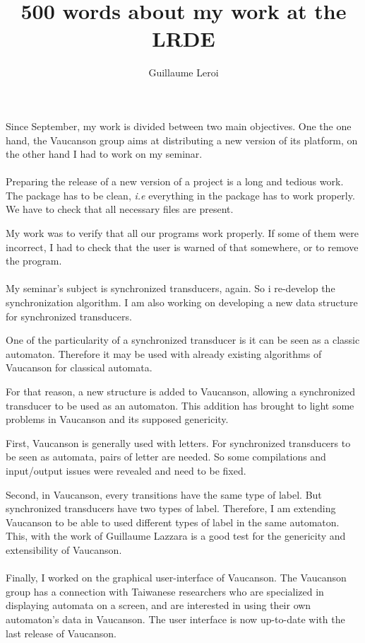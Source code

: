 \documentclass[a4paper, 11pt]{article}
\title{500 words about my work at the LRDE}
\author{Guillaume Leroi}
\begin{document}
\maketitle
\thispagestyle{empty}

Since September, my work is divided between two main objectives. One the one
hand, the Vaucanson group aims at distributing a new version of its platform, on
the other hand I had to work on my seminar.

\paragraph{}

Preparing the release of a new version of a project is a long and tedious
work. The package has to be clean, \emph{i.e} everything in the package has to
work properly. We have to check that all necessary files are present.

My work was to verify that all our programs work properly. If some of them were
incorrect, I had to check that the user is warned of that somewhere, or to
remove the program.

\paragraph{}

My seminar's subject is synchronized transducers, again. So i re-develop the
synchronization algorithm. I am also working on developing a new data structure
for synchronized transducers.

One of the particularity of a synchronized transducer is it can be seen as a
classic automaton. Therefore it may be used with already existing algorithms of
Vaucanson for classical automata.

For that reason, a new structure is added to Vaucanson, allowing a synchronized
transducer to be used as an automaton. This addition has brought to light some
problems in Vaucanson and its supposed genericity.

First, Vaucanson is generally used with letters. For synchronized transducers to
be seen as automata, pairs of letter are needed. So some compilations and
input/output issues were revealed and need to be fixed.

Second, in Vaucanson, every transitions have the same type of label. But
synchronized transducers have two types of label. Therefore, I am extending
Vaucanson to be able to used different types of label in the same automaton.
This, with the work of Guillaume Lazzara is a good test for the genericity and
extensibility of Vaucanson.

\paragraph{}

Finally, I worked on the graphical user-interface of Vaucanson. The Vaucanson
group has a connection with Taiwanese researchers who are specialized in
displaying automata on a screen, and are interested in using their own
automaton's data in Vaucanson.  The user interface is now up-to-date with the
last release of Vaucanson.
\end{document}
